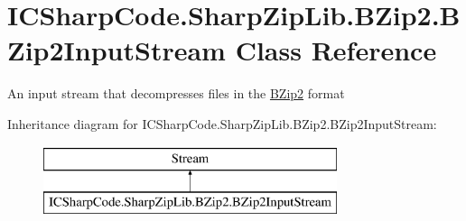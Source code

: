\hypertarget{class_i_c_sharp_code_1_1_sharp_zip_lib_1_1_b_zip2_1_1_b_zip2_input_stream}{}\section{I\+C\+Sharp\+Code.\+Sharp\+Zip\+Lib.\+B\+Zip2.\+B\+Zip2\+Input\+Stream Class Reference}
\label{class_i_c_sharp_code_1_1_sharp_zip_lib_1_1_b_zip2_1_1_b_zip2_input_stream}


An input stream that decompresses files in the \hyperlink{namespace_i_c_sharp_code_1_1_sharp_zip_lib_1_1_b_zip2}{B\+Zip2} format  


Inheritance diagram for I\+C\+Sharp\+Code.\+Sharp\+Zip\+Lib.\+B\+Zip2.\+B\+Zip2\+Input\+Stream\+:\begin{figure}[H]
\begin{center}
\leavevmode
\includegraphics[height=2.000000cm]{class_i_c_sharp_code_1_1_sharp_zip_lib_1_1_b_zip2_1_1_b_zip2_input_stream}
\end{center}
\end{figure}
